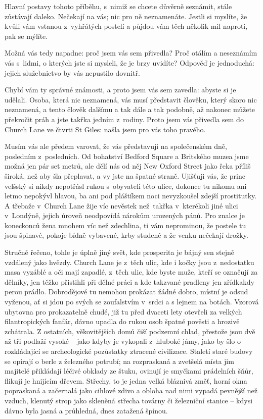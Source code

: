 Hlavní postavy tohoto příběhu, s nimiž se chcete důvěrně seznámit, stále zůstávají daleko. Nečekají na vás; nic pro ně neznamenáte. Jestli si myslíte, že kvůli vám vstanou z vyhřátých postelí a půjdou vám těch několik mil naproti, pak se mýlíte. 

Možná vás tedy napadne: proč jsem vás sem přivedla? Proč otálím a neseznámím vás s lidmi, o kterých jste si mysleli, že je brzy uvidíte? Odpověď je jednoduchá: jejich služebnictvo by vás nepustilo dovnitř. 

Chybí vám ty správné známosti, a proto jsem vás sem zavedla: abyste si je udělali. Osoba, která nic neznamená, vás musí představit člověku, který skoro nic neznamená, a tento člověk dalšímu a tak dále a tak podobně, až nakonec můžete překročit práh a jste takřka jedním z rodiny.
Proto jsem vás přivedla sem do Church Lane ve čtvrti St Giles: našla jsem pro vás toho pravého.

Musím vás ale předem varovat, že vás představuji na společenském dně, posledním z posledních. Od bohatství Bedford Square a Britského muzea jsme možná jen pár set metrů, ale dělí nás od něj New Oxford Street jako řeka příliš široká, než aby šla přeplavat, a vy jste na špatné straně. Ujišťuji vás, že princ velšský si nikdy nepotřásl rukou s obyvateli této ulice, dokonce tu nikomu ani letmo nepokývl hlavou, ba ani pod pláštíkem noci nevyzkoušel zdejší prostitutky. A třebaže v Church Lane žije víc nevěstek než takřka v kterékoli jiné ulici v Londýně, jejich úroveň neodpovídá nárokům urozených pánů. Pro znalce je koneckonců žena mnohem víc než zdechlina, ti vám neprominou, že postele tu jsou špinavé, pokoje bídně vybavené, krby studené a že venku nečekají drožky.

Stručně řečeno, tohle je úplně jiný svět, kde prosperita je bájný sen stejně vzdálený jako hvězdy. Church Lane je z těch ulic, kde i kočky jsou z nedostatku masa vyzáblé a oči mají zapadlé, z těch ulic, kde byste muže, kteří se označují za dělníky, jen těžko přistihli při dělné práci a kde takzvané pradleny jen zřídkakdy perou prádlo. Dobrodějové tu nemohou prokázat žádné dobro, místní je odsud vyženou, ať si jdou po svých se zoufalstvím v srdci a s lejnem na botách. Vzorová ubytovna pro prokazatelně chudé, již tu před dvaceti lety otevřeli za velkých filantropických fanfár, dávno upadla do rukou osob špatné pověsti a hrozivě zchátrala. Z ostatních, věkovitějších domů čiší podzemní chlad, přestože jsou dvě až tři podlaží vysoké -- jako kdyby je vykopali z hluboké jámy, jako by šlo o rozkládající se archeologické pozůstatky ztracené civilizace. Staletí staré budovy se opírají o berle z železného potrubí; na rozpraskaná a zvetšelá místa jim majitelé přikládají léčivé obklady ze štuku, ovinují je smyčkami prádelních šňůr, flikují je hnijícím dřevem. Střechy, to je jedna velká bláznivá změť, horní okna popraskaná a začernalá jako cihlové zdivo a obloha nad nimi vypadá pevnější než vzduch, klenutý strop jako skleněná střecha továrny či železniční stanice -- kdysi dávno byla jasná a průhledná, dnes zatažená špínou.

